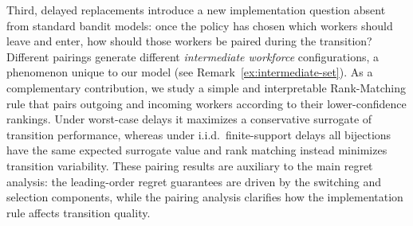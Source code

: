 \documentclass[opre,blindrev]{informs3}
\begin{document}
Third, delayed replacements introduce a new implementation question absent from standard bandit models: once the policy has chosen which workers should leave and enter, how should those workers be paired during the transition? Different pairings generate different \emph{intermediate workforce} configurations, a phenomenon unique to our model (see Remark~\ref{ex:intermediate-set}). As a complementary contribution, we study a simple and interpretable Rank-Matching rule that pairs outgoing and incoming workers according to their lower-confidence rankings. Under worst-case delays it maximizes a conservative surrogate of transition performance, whereas under i.i.d.\ finite-support delays all bijections have the same expected surrogate value and rank matching instead minimizes transition variability. These pairing results are auxiliary to the main regret analysis: the leading-order regret guarantees are driven by the switching and selection components, while the pairing analysis clarifies how the implementation rule affects transition quality.

%
\end{document}
